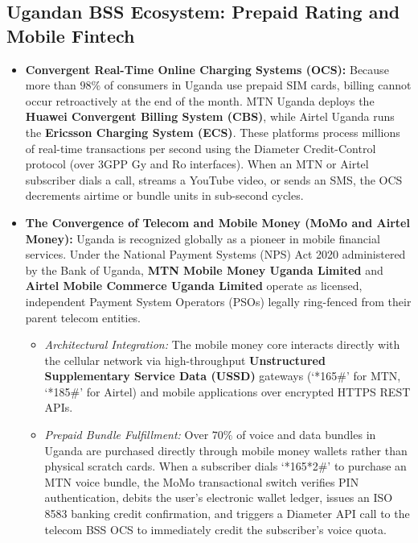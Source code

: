 \documentclass[12pt,a4paper]{report}
\begin{document}
\subsection{Ugandan BSS Ecosystem: Prepaid Rating and Mobile Fintech}
\begin{itemize}
    \item \textbf{Convergent Real-Time Online Charging Systems (OCS):}
    Because more than $98\%$ of consumers in Uganda use prepaid SIM cards, billing cannot occur retroactively at the end of the month. MTN Uganda deploys the \textbf{Huawei Convergent Billing System (CBS)}, while Airtel Uganda runs the \textbf{Ericsson Charging System (ECS)}. These platforms process millions of real-time transactions per second using the Diameter Credit-Control protocol (over 3GPP Gy and Ro interfaces). When an MTN or Airtel subscriber dials a call, streams a YouTube video, or sends an SMS, the OCS decrements airtime or bundle units in sub-second cycles.
    
    \item \textbf{The Convergence of Telecom and Mobile Money (MoMo and Airtel Money):}
    Uganda is recognized globally as a pioneer in mobile financial services. Under the National Payment Systems (NPS) Act 2020 administered by the Bank of Uganda, \textbf{MTN Mobile Money Uganda Limited} and \textbf{Airtel Mobile Commerce Uganda Limited} operate as licensed, independent Payment System Operators (PSOs) legally ring-fenced from their parent telecom entities.
    \begin{itemize}
        \item \textit{Architectural Integration:} The mobile money core interacts directly with the cellular network via high-throughput \textbf{Unstructured Supplementary Service Data (USSD)} gateways (`*165\#' for MTN, `*185\#' for Airtel) and mobile applications over encrypted HTTPS REST APIs.
        \item \textit{Prepaid Bundle Fulfillment:} Over $70\%$ of voice and data bundles in Uganda are purchased directly through mobile money wallets rather than physical scratch cards. When a subscriber dials `*165*2\#' to purchase an MTN voice bundle, the MoMo transactional switch verifies PIN authentication, debits the user's electronic wallet ledger, issues an ISO 8583 banking credit confirmation, and triggers a Diameter API call to the telecom BSS OCS to immediately credit the subscriber's voice quota.
    \end{itemize}
\end{itemize}
\end{document}
